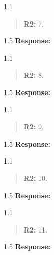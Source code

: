 \documentclass[12pt,english]{article}
\newcommand{\rrquote}{1.1}
\newcommand{\rrxspc}{1.5}
\begin{document}
\begin{refsection}
    \begin{spacing}{\rrquote}
        \begin{quotation}
        \textbf{R2: } 7. 
        \end{quotation}
        \end{spacing}
        
        \begin{spacing}{\rrxspc}
           \textbf{Response:}  
    \end{spacing}

    \begin{spacing}{\rrquote}
        \begin{quotation}
        \textbf{R2: } 8. 
        \end{quotation}
        \end{spacing}
        
        \begin{spacing}{\rrxspc}
           \textbf{Response:}  
    \end{spacing}

    \begin{spacing}{\rrquote}
        \begin{quotation}
        \textbf{R2: } 9. 
        \end{quotation}
        \end{spacing}
        
        \begin{spacing}{\rrxspc}
           \textbf{Response:}  
    \end{spacing}

    \begin{spacing}{\rrquote}
        \begin{quotation}
        \textbf{R2: } 10. 
        \end{quotation}
        \end{spacing}
        
        \begin{spacing}{\rrxspc}
           \textbf{Response:}  
    \end{spacing}

    \begin{spacing}{\rrquote}
        \begin{quotation}
        \textbf{R2: } 11. 
        \end{quotation}
        \end{spacing}
        
        \begin{spacing}{\rrxspc}
           \textbf{Response:}  
    \end{spacing}


\end{refsection}
\end{document}
